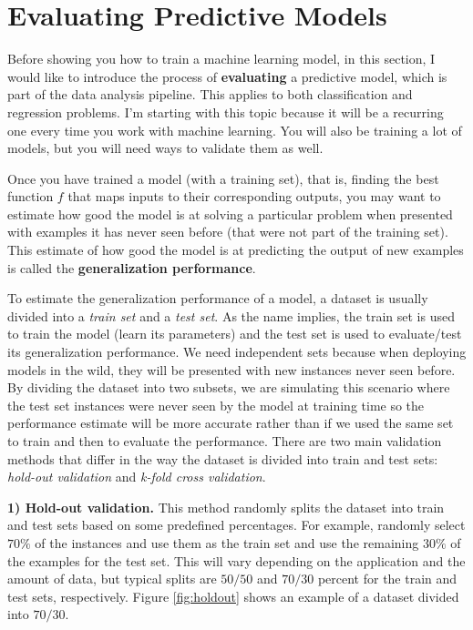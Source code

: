 \documentclass[
  11pt,
]{krantz}
\begin{document}
\hypertarget{trainingeval}{%
\section{Evaluating Predictive Models}\label{trainingeval}}

Before showing you how to train a machine learning model, in this section, I would like to introduce the process of \textbf{evaluating} a predictive model, which is part of the data analysis pipeline. This applies to both classification and regression problems. I'm starting with this topic because it will be a recurring one every time you work with machine learning. You will also be training a lot of models, but you will need ways to validate them as well.

Once you have trained a model (with a training set), that is, finding the best function \(f\) that maps inputs to their corresponding outputs, you may want to estimate how good the model is at solving a particular problem when presented with examples it has never seen before (that were not part of the training set). This estimate of how good the model is at predicting the output of new examples is called the \textbf{generalization performance}.

To estimate the generalization performance of a model, a dataset is usually divided into a \emph{train set} and a \emph{test set}. As the name implies, the train set is used to train the model (learn its parameters) and the test set is used to evaluate/test its generalization performance. We need independent sets because when deploying models in the wild, they will be presented with new instances never seen before. By dividing the dataset into two subsets, we are simulating this scenario where the test set instances were never seen by the model at training time so the performance estimate will be more accurate rather than if we used the same set to train and then to evaluate the performance. There are two main validation methods that differ in the way the dataset is divided into train and test sets: \emph{hold-out validation} and \emph{k-fold cross validation}.

\textbf{1) Hold-out validation.} This method randomly splits the dataset into train and test sets based on some predefined percentages. For example, randomly select \(70\%\) of the instances and use them as the train set and use the remaining \(30\%\) of the examples for the test set. This will vary depending on the application and the amount of data, but typical splits are \(50/50\) and \(70/30\) percent for the train and test sets, respectively. Figure \ref{fig:holdout} shows an example of a dataset divided into \(70/30\).
\end{document}
